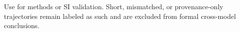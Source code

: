 Use for methods or SI validation. Short, mismatched, or provenance-only trajectories remain labeled as such and are excluded from formal cross-model conclusions.
